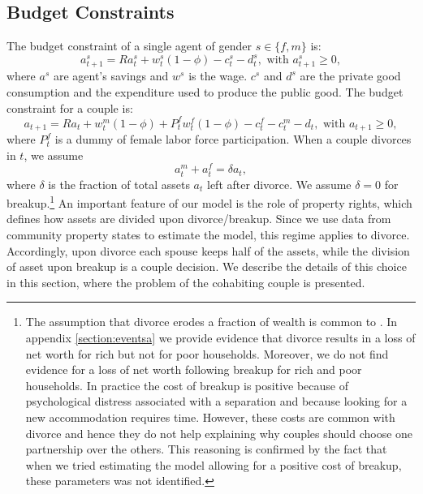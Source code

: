 \documentclass[12pt]{article}
\numberwithin{table}{section}
\begin{document}
\subsection{Budget Constraints}
The budget constraint of a single agent of gender  $s\in\{f,m\}$ is:
\begin{equation}\label{eq:bcs}
a^s_{t+1}=R a^s_t+w^s_t(1-\phi)-c^s_t-d^s_t, \text{ with }a^s_{t+1}\geq0,
\end{equation}
where $a^s$ are agent's savings and $w^s$ is the wage. $c^s$ and $d^s$ are the private good consumption and the expenditure used to produce the public good.
The budget constraint for a couple is:
\begin{equation}\label{eq:bcm}
a_{t+1}=R a_t+w^m_t(1-\phi)+P^f_t w^f_t(1-\phi)-c^f_t-c^m_t-d_t, \text{ with }a_{t+1}\geq0,
\end{equation}
where $P^f_t$ is a dummy of female labor force participation.
When a couple divorces in $t$, we assume 
\[a^m_t+a^f_t=\delta a_t,\]
where $\delta$ is the fraction of total assets $a_t$ left after divorce. We assume $\delta=0$ for breakup.\footnote{The assumption that divorce erodes a fraction of wealth is common to \cite{cubeddu2003}. In appendix \ref{section:eventsa} we provide evidence that divorce results in a loss of net worth for rich but not for poor households. Moreover, we do not find evidence for a loss of net worth following breakup for rich and poor households. In practice the cost of breakup is positive because of psychological distress associated with a separation and because looking for a new accommodation requires time. However, these costs are common with divorce and hence they do not help explaining why couples should choose one partnership over the others. This reasoning is confirmed by the fact that when we tried estimating the model allowing for a positive cost of breakup, these parameters was not identified.} 
An important feature of our model is the role of property rights, which defines how assets are divided upon divorce/breakup. Since we use data from community property states to estimate the model, this regime applies to divorce. Accordingly, upon divorce each spouse keeps half of the assets, while the division of asset upon breakup is a couple decision. We describe the details of this choice in this section, where the problem of the cohabiting couple is presented.
\end{document}
